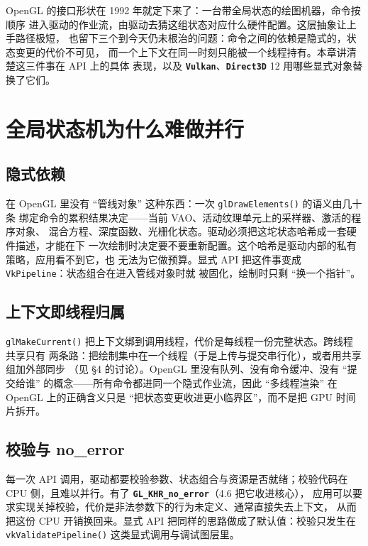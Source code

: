 \documentclass[12pt,a4paper,fontset=fandol]{ctexbook}
\newcommand{\Fn}[1]{\texttt{#1()}}
\newcommand{\Tp}[1]{\texttt{#1}}
\newcommand{\Lib}[1]{\textbf{\texttt{#1}}}
\newcommand{\Lang}[1]{\textsf{#1}}
\newcommand{\DomCPU}{\Lang{CPU}}
\begin{document}
OpenGL 的接口形状在 1992 年就定下来了：一台带全局状态的绘图机器，命令按顺序
进入驱动的作业流，由驱动去猜这组状态对应什么硬件配置。这层抽象让上手路径极短，
也留下三个到今天仍未根治的问题：命令之间的依赖是隐式的，状态变更的代价不可见，
而一个上下文在同一时刻只能被一个线程持有。本章讲清楚这三件事在 API 上的具体
表现，以及 \Lib{Vulkan}、\Lib{Direct3D} 12 用哪些显式对象替换了它们。

\section{全局状态机为什么难做并行}

\subsection{隐式依赖}

在 OpenGL 里没有 ``管线对象'' 这种东西：一次 \Fn{glDrawElements} 的语义由几十条
绑定命令的累积结果决定------当前 VAO、活动纹理单元上的采样器、激活的程序对象、
混合方程、深度函数、光栅化状态。驱动必须把这坨状态哈希成一套硬件描述，才能在下
一次绘制时决定要不要重新配置。这个哈希是驱动内部的私有策略，应用看不到它，也
无法为它做预算。显式 API 把这件事变成 \Tp{VkPipeline}：状态组合在进入管线对象时就
被固化，绘制时只剩 ``换一个指针''。

\subsection{上下文即线程归属}

\Fn{glMakeCurrent} 把上下文绑到调用线程，代价是每线程一份完整状态。跨线程共享只有
两条路：把绘制集中在一个线程（于是上传与提交串行化），或者用共享组加外部同步
（见 \S 4 的讨论）。OpenGL 里没有队列、没有命令缓冲、没有
``提交给谁'' 的概念------所有命令都进同一个隐式作业流，因此 ``多线程渲染'' 在
OpenGL 上的正确含义只是 ``把状态变更收进更小临界区''，而不是把 GPU 时间片拆开。

\subsection{校验与 no\_error}

每一次 API 调用，驱动都要校验参数、状态组合与资源是否就绪；校验代码在
\DomCPU{} 侧，且难以并行。有了 \Lib{GL\_KHR\_no\_error}（4.6 把它收进核心），
应用可以要求实现关掉校验，代价是非法参数下的行为未定义、通常直接失去上下文，
从而把这份 CPU 开销换回来。显式 API 把同样的思路做成了默认值：校验只发生在 \Fn{vkValidatePipeline}
这类显式调用与调试图层里。
\end{document}
